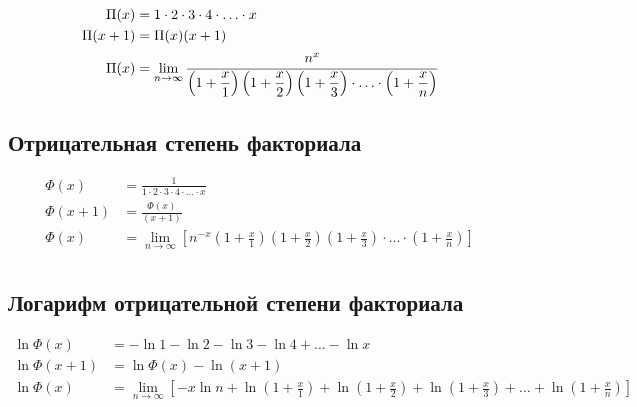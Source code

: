 \begin{equation*}
\begin{aligned}
\Pi(x) &= 1 \cdot 2 \cdot 3 \cdot 4 \cdot \ldots \cdot x
\\
\Pi(x + 1) &= \Pi(x) (x + 1)
\\
\Pi(x) &= \lim_{n \to \infty}
{
\cfrac{n^x}
{
\left(1 + \displaystyle \frac{x}{1} \right) 
\left(1 + \displaystyle \frac{x}{2} \right)
\left(1 + \displaystyle \frac{x}{3} \right) 
\cdot \ldots \cdot 
\left(1 + \displaystyle \frac{x}{n} \right)
}
} \\
\end{aligned}
\end{equation*}

\subsection{Отрицательная степень факториала}

\begin{equation*}
\begin{aligned}
\Phi(x) &= \frac{1}{1 \cdot 2 \cdot 3 \cdot 4 \cdot \ldots \cdot x} \\
\Phi(x + 1) &= \frac{\Phi(x)}{(x + 1)} \\
\Phi(x) &= \lim_{n \to \infty} \left[
n^{-x}
\left(1 + \displaystyle \frac{x}{1} \right) 
\left(1 + \displaystyle \frac{x}{2} \right)
\left(1 + \displaystyle \frac{x}{3} \right) 
\cdot \ldots \cdot 
\left(1 + \displaystyle \frac{x}{n} \right) \right] \\
\end{aligned}
\end{equation*}

\subsection{Логарифм отрицательной степени факториала}

\begin{equation*}
\begin{aligned}
\ln{\Phi(x)} &= - \ln{1} - \ln{2} - \ln{3} - \ln{4} + \ldots - \ln{x} \\
\ln{\Phi(x + 1)} &= \ln{\Phi(x)} - \ln{(x + 1)} \\
\ln{\Phi(x)} &= \lim_{n \to \infty}
{\left[
- x \ln{n}
+ \ln{\left(1 + \frac{x}{1} \right)} 
+ \ln{\left(1 + \frac{x}{2} \right)}
+ \ln{\left(1 + \frac{x}{3} \right)}
+ \ldots
+ \ln{\left(1 + \frac{x}{n} \right)}
\right]} \\
\end{aligned}
\end{equation*}


